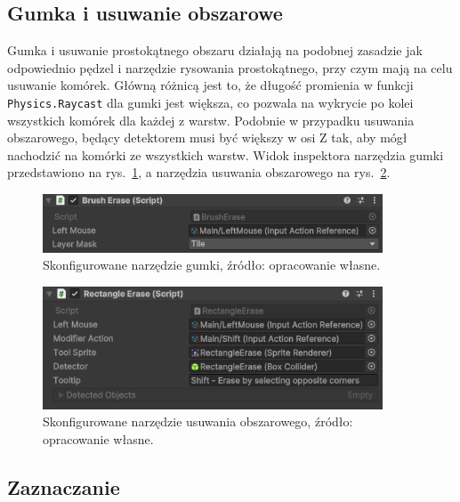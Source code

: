 \subsection{Gumka i usuwanie obszarowe}
\label{subsec:gumka_i_usuwanie_obszarowe}

Gumka i usuwanie prostokątnego obszaru działają na podobnej zasadzie jak odpowiednio pędzel
i narzędzie rysowania prostokątnego, przy czym mają na celu usuwanie komórek.
Główną różnicą jest to, że długość promienia w funkcji \texttt{Physics.Raycast} dla gumki jest większa,
co pozwala na wykrycie po kolei wszystkich komórek dla każdej z warstw.
Podobnie w przypadku usuwania obszarowego,
 będący detektorem musi być większy w osi Z tak, aby mógł nachodzić na komórki ze wszystkich warstw.
Widok inspektora narzędzia gumki przedstawiono na rys.~\ref{fig:erase},
a narzędzia usuwania obszarowego na rys.~\ref{fig:recta_erase}.

\begin{figure}[h!]
    \centering
    \includegraphics[width=0.9\textwidth]{chapters/chapter4/rys/tools/brush_erase}
    \caption[Skonfigurowane narzędzie gumki.]{Skonfigurowane narzędzie gumki, źródło: opracowanie własne.}
    \label{fig:erase}
\end{figure}

\begin{figure}[h!]
    \centering
    \includegraphics[width=0.9\textwidth]{chapters/chapter4/rys/tools/rectangle_erase}
    \caption[Skonfigurowane narzędzie usuwania obszarowego.]
    {Skonfigurowane narzędzie usuwania obszarowego, źródło: opracowanie własne.}
    \label{fig:recta_erase}
\end{figure}

\subsection{Zaznaczanie}
\label{subsec:zaznaczanie}

